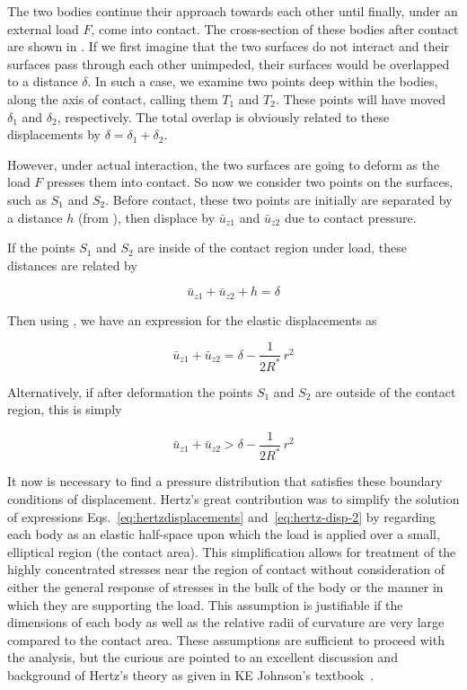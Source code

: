 The two bodies continue their approach towards each other until finally, under an external load $F$, come into contact. The cross-section of these bodies after contact are shown in . If we first imagine that the two surfaces do not interact and their surfaces pass through each other unimpeded, their surfaces would be overlapped to a distance $\delta$. In such a case, we examine two points deep within the bodies, along the axis of contact, calling them $T_{1}$ and $T_2$. These points will have moved $\delta_1$ and $\delta_2$, respectively. The total overlap is obviously related to these displacements by $\delta = \delta_1 + \delta_2$. 

However, under actual interaction, the two surfaces are going to deform as the load $F$ presses them into contact. So now we consider two points on the surfaces, such as $S_1$ and $S_2$. Before contact, these two points are initially are separated by a distance $h$ (from ), then displace by $\bar{u}_{z1}$ and $\bar{u}_{z2}$ due to contact pressure. 

If the points $S_1$ and $S_2$ are inside of the contact region under load, these distances are related by

\begin{equation}
	\bar{u}_{z1} + \bar{u}_{z2} + h = \delta
\end{equation}

Then using , we have an expression for the elastic displacements as

\begin{equation}\label{eq:hertzdisplacements}
	\bar{u}_{z1} + \bar{u}_{z2} = \delta - \frac{1}{2R^*} \, r^2
\end{equation}

Alternatively, if after deformation the points $S_1$ and $S_2$ are outside of the contact region, this is simply

\begin{equation}\label{eq:hertz-disp-2}
	\bar{u}_{z1} + \bar{u}_{z2} > \delta - \frac{1}{2R^*} \, r^2
\end{equation}

It now is necessary to find a pressure distribution that satisfies these boundary conditions of displacement. Hertz's great contribution was to simplify the solution of expressions Eqs.~\ref{eq:hertzdisplacements} and~\ref{eq:hertz-disp-2} by regarding each body as an elastic half-space upon which the load is applied over a small, elliptical region (the contact area). This simplification allows for treatment of the highly concentrated stresses near the region of contact without consideration of either the general response of stresses in the bulk of the body or the manner in which they are supporting the load. This assumption is justifiable if the dimensions of each body as well as the relative radii of curvature are very large compared to the contact area. These assumptions are sufficient to proceed with the analysis, but the curious are pointed to an excellent discussion and background of Hertz's theory as given in KE Johnson's textbook~\cite{Johnson1985}.

